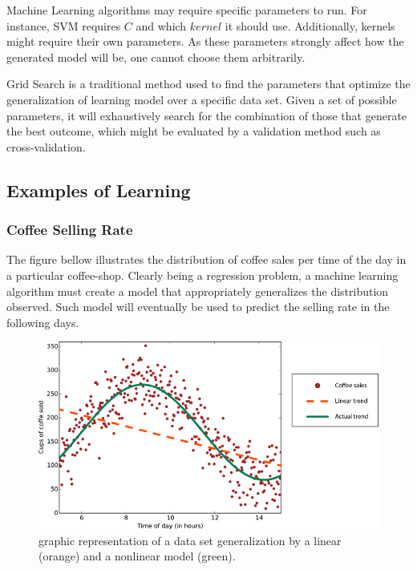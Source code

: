 \documentclass[12pt]{report}
\begin{document}
Machine Learning algorithms may require specific parameters to run. For instance, SVM requires $C$ and which $kernel$ it should use. Additionally, kernels might require their own parameters. As these parameters strongly affect how the generated model will be, one cannot choose them arbitrarily.

Grid Search is a traditional method used to find the parameters that optimize the generalization of learning model over a specific data set. \cite{gridsearch} Given a set of possible parameters, it will exhaustively search for the combination of those that generate the best outcome, which might be evaluated by a validation method such as cross-validation.

\subsection{Examples of Learning}

\subsubsection{Coffee Selling Rate}

The figure bellow illustrates the distribution of coffee sales per time of the day in a particular coffee-shop. \cite{roh2015} Clearly being a regression problem, a machine learning algorithm must create a model that appropriately generalizes the distribution observed. Such model will eventually be used to predict the selling rate in the following days.

\begin{figure}[H]
	\centering
	\captionsetup{justification=centering}

	\includegraphics[scale=.6]{rohrer2015}
	\caption{graphic representation of a data set generalization by a linear (orange) and a nonlinear model (green).}
	\label{fig:rohrer2015}
\end{figure}
\end{document}
